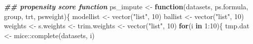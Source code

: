 \documentclass[
]{book}
\newenvironment{Shaded}{\begin{snugshade}}{\end{snugshade}}
\newcommand{\ControlFlowTok}[1]{\textcolor[rgb]{0.13,0.29,0.53}{\textbf{#1}}}
\newcommand{\DecValTok}[1]{\textcolor[rgb]{0.00,0.00,0.81}{#1}}
\newcommand{\DocumentationTok}[1]{\textcolor[rgb]{0.56,0.35,0.01}{\textbf{\textit{#1}}}}
\newcommand{\FunctionTok}[1]{\textcolor[rgb]{0.00,0.00,0.00}{#1}}
\newcommand{\NormalTok}[1]{#1}
\newcommand{\OtherTok}[1]{\textcolor[rgb]{0.56,0.35,0.01}{#1}}
\newcommand{\SpecialCharTok}[1]{\textcolor[rgb]{0.00,0.00,0.00}{#1}}
\newcommand{\StringTok}[1]{\textcolor[rgb]{0.31,0.60,0.02}{#1}}
\begin{document}
\begin{Shaded}
\begin{Highlighting}[]
\DocumentationTok{\#\# propensity score function}
\NormalTok{ps\_impute }\OtherTok{\textless{}{-}} \ControlFlowTok{function}\NormalTok{(datasets, ps.formula, group, trt, psweight)\{}
\NormalTok{  modellist }\OtherTok{\textless{}{-}} \FunctionTok{vector}\NormalTok{(}\StringTok{"list"}\NormalTok{, }\DecValTok{10}\NormalTok{)}
\NormalTok{  ballist }\OtherTok{\textless{}{-}} \FunctionTok{vector}\NormalTok{(}\StringTok{"list"}\NormalTok{, }\DecValTok{10}\NormalTok{)}
\NormalTok{  weights }\OtherTok{\textless{}{-}}\NormalTok{ s.weights }\OtherTok{\textless{}{-}}\NormalTok{ trim.weights }\OtherTok{\textless{}{-}} \FunctionTok{vector}\NormalTok{(}\StringTok{"list"}\NormalTok{, }\DecValTok{10}\NormalTok{)}
  \ControlFlowTok{for}\NormalTok{(i }\ControlFlowTok{in} \DecValTok{1}\SpecialCharTok{:}\DecValTok{10}\NormalTok{)\{}
\NormalTok{    tmp.dat }\OtherTok{\textless{}{-}}\NormalTok{ mice}\SpecialCharTok{::}\FunctionTok{complete}\NormalTok{(datasets, i)}
    

\end{Highlighting}
\end{Shaded}
\end{document}

